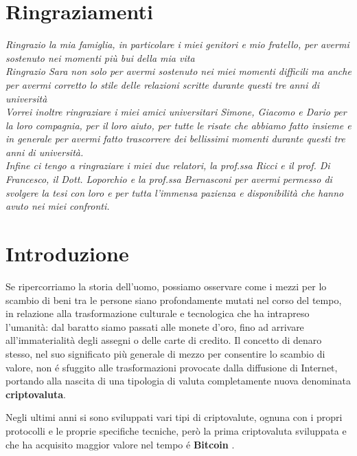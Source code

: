 \chapter*{Ringraziamenti} %
\begin{flushright}
\itshape 
Ringrazio la mia famiglia, in particolare i miei genitori e mio fratello, per avermi sostenuto nei momenti più bui della mia vita\\
Ringrazio Sara non solo per avermi sostenuto nei miei momenti difficili ma anche per avermi corretto lo stile delle relazioni scritte durante questi tre anni di università\\ 
Vorrei inoltre ringraziare i miei amici universitari Simone, Giacomo e Dario per la loro compagnia, per il loro aiuto, per tutte le risate che abbiamo fatto insieme e in generale per avermi fatto trascorrere dei bellissimi momenti durante questi tre anni di università.\\
Infine ci tengo a ringraziare i miei due relatori, la prof.ssa Ricci e il prof. Di Francesco, il Dott. Loporchio e la prof.ssa Bernasconi per avermi permesso di svolgere la tesi con loro e per tutta l'immensa pazienza e disponibilità che hanno avuto nei miei confronti.
\end{flushright}


\chapter{Introduzione}
Se ripercorriamo la storia dell'uomo, possiamo osservare come i mezzi per lo scambio di beni tra le persone siano profondamente mutati nel corso del tempo, in relazione alla trasformazione culturale e tecnologica che ha intrapreso l'umanità: dal baratto siamo passati alle monete d’oro, fino ad arrivare all’immaterialità degli assegni o delle carte di credito. Il concetto di denaro stesso, nel suo significato più generale di mezzo per consentire lo scambio di valore, non é sfuggito alle trasformazioni provocate dalla diffusione di Internet, portando alla nascita di una tipologia di valuta completamente nuova denominata \textbf{criptovaluta}. 

Negli ultimi anni si sono sviluppati vari tipi di criptovalute, ognuna con i propri protocolli e le proprie specifiche tecniche, però la prima criptovaluta sviluppata e che ha acquisito maggior valore nel tempo é \textbf{Bitcoin} \cite{btcbook}. 

